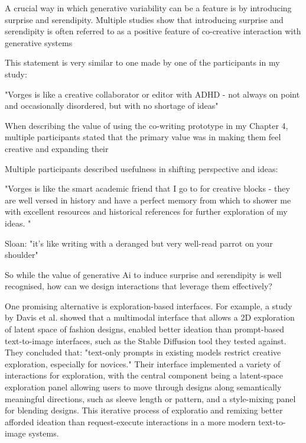 A crucial way in which generative variability can be a feature is by introducing surprise and serendipity. Multiple studies show that introducing surprise and serendipity is often referred to as a positive feature of co-creative interaction with generative systems \cite{Lawton2023-tb, Chiou2023-vr, Louie2020-aq, Moruzzi2022-gp, Park2024-gw, Koch2020-gx}


This statement is very similar to one made by one of the participants in my study: 

"Vorges is like a creative collaborator or editor with ADHD - not always on point and occasionally disordered, but with no shortage of ideas"

When describing the value of using the co-writing prototype in my Chapter 4, multiple participants stated that the primary value was in making them feel creative and expanding their 

Multiple participants described usefulness in shifting perspective and ideas:

"Vorges is like the smart academic friend that I go to for creative blocks - they are well versed in history and have a perfect memory from which to shower me with excellent resources and historical references for further exploration of my ideas. "

Sloan: "it’s like writing with a deranged but very well-read parrot on your shoulder"

So while the value of generative Ai to induce surprise and serendipity is well recognised, how can we design interactions that leverage them effectively? 

One promising alternative is exploration-based interfaces. For example, a study by Davis et al. \cite{Davis2024-ml} showed that a multimodal interface that allows a 2D exploration of latent space of fashion designs, enabled better ideation than prompt-based text-to-image interfaces, such as the Stable Diffusion tool they tested against. They concluded that: "text-only prompts in existing models restrict creative exploration, especially for novices." Their interface implemented a variety of interactions for exploration, with the central component being a latent-space exploration panel allowing users to move through designs along semantically meaningful directions, such as sleeve length or pattern, and a style-mixing panel for blending designs. This iterative process of exploratio and remixing better afforded ideation than request-execute interactions in a more modern text-to-image systems. 

